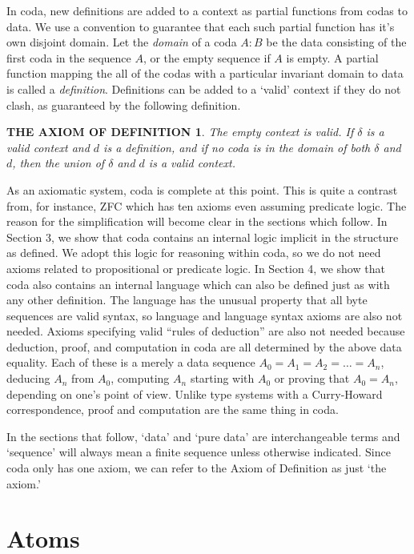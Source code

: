 \documentclass[11pt]{article}
\begin{document}
     In coda, new definitions are added to a context as partial functions from codas to data.  We use a convention to guarantee that each such partial
function has it's own disjoint domain.  Let the {\it domain} of a coda $A:B$ be the data consisting of the first coda in the sequence $A$, or the empty
sequence if $A$ is empty.  A partial function mapping the all of the codas with a particular invariant domain to data is called a {\it definition}.  Definitions
can be added to a `valid' context if they do not clash, as guaranteed by the following definition.
\newtheorem*{remark}{THE AXIOM OF DEFINITION}
\begin{remark}  The empty context is valid.  If $\delta$ is a valid context and $d$ is a definition, and if no coda is in
the domain of both $\delta$ and $d$, then the union of $\delta$ and $d$ is a valid context.
\end{remark}
\noindent As an axiomatic system, coda is complete at this point.  This is quite a contrast from, for instance, ZFC which has ten axioms
even assuming predicate logic.  The reason for the simplification will become clear in the sections which follow.  In Section 3, we show
that coda contains an internal logic implicit in the structure as defined.  We adopt this logic for reasoning within coda, so we do not
need axioms related to propositional or predicate logic.  In Section 4, we show that coda also contains an internal language which can
also be defined just as with any other definition.  The language has the unusual property that all byte sequences are valid syntax,
so language and language syntax axioms are also not needed.  Axioms specifying valid ``rules of deduction'' are also not needed
because deduction, proof, and computation in coda are all determined by the above data equality.  Each of these is a merely a data sequence $A_0=A_1=A_2=\dots=A_n$,
deducing $A_n$ from $A_0$, computing $A_n$ starting with $A_0$ or proving that $A_0=A_n$, depending on one's point of view.
Unlike type systems with a Curry-Howard correspondence, proof and computation are the same thing in coda.

In the sections that follow,
`data' and `pure data' are interchangeable terms and `sequence' will always mean a finite sequence unless otherwise indicated.  Since coda
only has one axiom, we can refer to the Axiom of Definition as just `the axiom.'

\section{Atoms}
\end{document}
